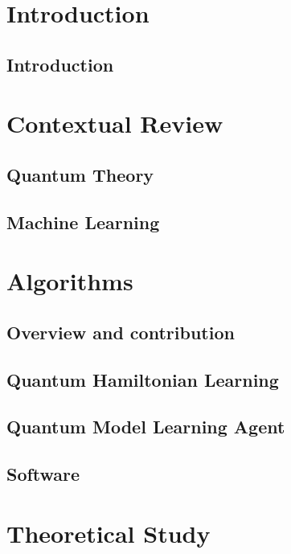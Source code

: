 
\part*{Introduction}\label{part:intro}
    \chapter{Introduction}\label{chapter:intro}
        

\part{Contextual Review}\label{part:contextual_review}
    \chapter{Quantum Theory}\label{chapter:qm}
        
    \chapter{Machine Learning}\label{chapter:ml}
        

\part{Algorithms}\label{part:algorithms}
    \chapter*{Overview and contribution}
        
    \chapter{Quantum Hamiltonian Learning}\label{chapter:qhl}
        
    \chapter{Quantum Model Learning Agent}\label{chapter:qmla}
        
    \chapter{Software}\label{chapter:sw}
        

\part{Theoretical Study}\label{part:theoretical_study}
